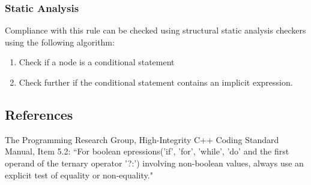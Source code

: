 \subsubsection{Static Analysis} 

Compliance with this rule can be checked using structural static analysis checkers using the following algorithm:

\begin{enumerate}
\item Check if a node is a conditional statement
\item Check further if the conditional statement contains an implicit expression.
\end{enumerate}

\subsection{References}

The Programming Research Group, High-Integrity C++ Coding Standard Manual, Item 5.2: ``For boolean epressions('if', 'for', 'while', 'do' and the first operand of the ternary operator '?:') involving non-boolean values, always use an explicit test of equality or non-equality."
